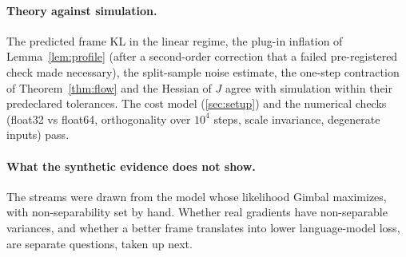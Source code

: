 \paragraph{Theory against simulation.} The predicted frame KL in the linear regime, the plug-in
inflation of Lemma~\ref{lem:profile} (after a second-order correction that a failed pre-registered
check made necessary), the split-sample noise estimate, the one-step contraction of
Theorem~\ref{thm:flow} and the Hessian of $J$ agree with simulation within their predeclared
tolerances. The cost model (\cref{sec:setup}) and the numerical checks (float32 vs float64,
orthogonality over $10^4$ steps, scale invariance, degenerate inputs) pass.

\begin{table}[t]
\centering\small

\caption{Noisy quadratics (E2.5): Gimbal's mean final loss and its geometric-mean ratio to each
peer on paired evaluation seeds (below 1: Gimbal lower), learning rates tuned per method on equal
grids. $\gamma$: non-separability of the curvature; $\sigma$: noise level.}
\label{tab:mc}
\end{table}

\paragraph{What the synthetic evidence does not show.} The streams were drawn from the model whose
likelihood Gimbal maximizes, with non-separability set by hand. Whether real gradients have
non-separable variances, and whether a better frame translates into lower language-model loss,
are separate questions, taken up next.
